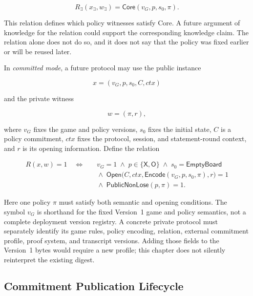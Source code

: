 \begin{equation}
\label{eq:ttt-existential-relation}
R_{\exists}(x_{\exists},w_{\exists})=
\mathsf{Core}(v_G,p,s_0,\pi).
\end{equation}

This relation defines which policy witnesses satisfy Core. A future argument
of knowledge for the relation could support the corresponding knowledge claim.
The relation alone does not do so, and it does not say that the policy was
fixed earlier or will be reused later.

In \emph{committed mode}, a future protocol may use the public instance

\[
 x=(v_G,p,s_0,C,\mathit{ctx})
\]

and the private witness

\[
 w=(\pi,r),
\]

where $v_G$ fixes the game and policy versions, $s_0$ fixes the initial state,
$C$ is a policy commitment, $\mathit{ctx}$ fixes the protocol, session, and
statement-round context, and $r$ is its opening information. Define the
relation

\begin{equation}
\label{eq:ttt-committed-policy-relation}
 \begin{aligned}
 R(x,w)=1 \quad\Longleftrightarrow\quad{}
 &v_G=1 \;\land\; p\in\{\mathsf{X},\mathsf{O}\}
     \;\land\; s_0=\mathsf{EmptyBoard} \\
 &{}\land\;\mathsf{Open}\bigl(C,\mathit{ctx},
     \mathsf{Encode}(v_G,p,s_0,\pi),r\bigr)=1 \\
 &{}\land\;\mathsf{PublicNonLose}(p,\pi)=1.
 \end{aligned}
\end{equation}

Here one policy $\pi$ must satisfy both semantic and opening conditions. The
symbol $v_G$ is shorthand for the fixed Version~1 game and policy semantics,
not a complete deployment version registry. A concrete private protocol must
separately identify its game rules, policy encoding, relation, external
commitment profile, proof system, and transcript versions. Adding those fields
to the Version~1 bytes would require a new profile; this chapter does not
silently reinterpret the existing digest.

\subsection{Commitment Publication Lifecycle}
\label{sec:ttt-commitment-lifecycle}

